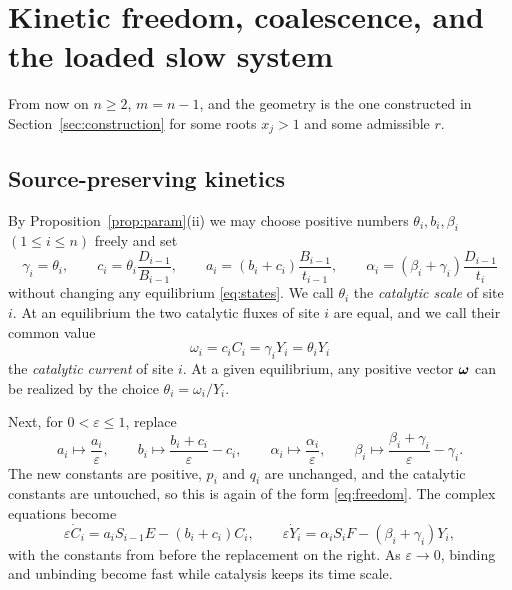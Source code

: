 \section{Kinetic freedom, coalescence, and the loaded slow system}\label{sec:loaded}
From now on \(n\ge2\), \(m=n-1\), and the geometry is the one constructed in
Section~\ref{sec:construction} for some roots \(x_j>1\) and some admissible \(r\).

\subsection{Source-preserving kinetics}
By Proposition~\ref{prop:param}(ii) we may choose positive numbers \(\theta_i,b_i,\beta_i\)
\((1\le i\le n)\) freely and set
\begin{equation}\label{eq:freedom}
 \gamma_i=\theta_i,\qquad c_i=\theta_i\frac{D_{i-1}}{B_{i-1}},\qquad
 a_i=(b_i+c_i)\frac{B_{i-1}}{t_{i-1}},\qquad \alpha_i=(\beta_i+\gamma_i)\frac{D_{i-1}}{t_i}
\end{equation}
without changing any equilibrium \eqref{eq:states}. We call \(\theta_i\) the \emph{catalytic
scale} of site \(i\). At an equilibrium the two catalytic fluxes of site \(i\) are equal, and
we call their common value
\begin{equation}\label{eq:current}
 \omega_i=c_iC_i=\gamma_iY_i=\theta_iY_i
\end{equation}
the \emph{catalytic current} of site \(i\). At a given equilibrium, any positive vector
\(\boldsymbol\omega\) can be realized by the choice \(\theta_i=\omega_i/Y_i\).

Next, for \(0<\varepsilon\le1\), replace
\begin{equation}\label{eq:relaxation}
 a_i\mapsto\frac{a_i}{\varepsilon},\qquad b_i\mapsto\frac{b_i+c_i}{\varepsilon}-c_i,\qquad
 \alpha_i\mapsto\frac{\alpha_i}{\varepsilon},\qquad
 \beta_i\mapsto\frac{\beta_i+\gamma_i}{\varepsilon}-\gamma_i .
\end{equation}
The new constants are positive, \(p_i\) and \(q_i\) are unchanged, and the catalytic constants
are untouched, so this is again of the form \eqref{eq:freedom}. The complex equations become
\begin{equation}\label{eq:fastslow}
 \varepsilon\dot C_i=a_iS_{i-1}E-(b_i+c_i)C_i,\qquad
 \varepsilon\dot Y_i=\alpha_iS_iF-(\beta_i+\gamma_i)Y_i,
\end{equation}
with the constants from before the replacement on the right. As \(\varepsilon\to0\), binding
and unbinding become fast while catalysis keeps its time scale.

